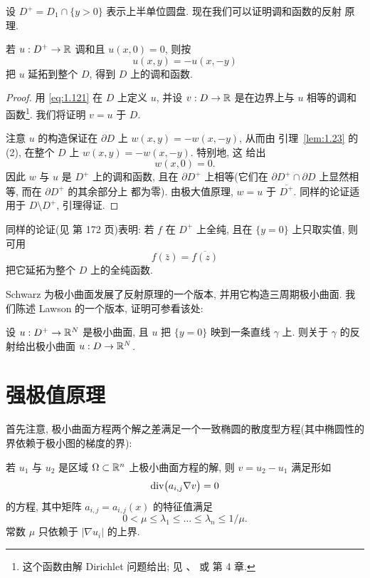 设 $D^+=D_1\cap\{y>0\}$ 表示上半单位圆盘. 现在我们可以证明调和函数的反射
原理.

\begin{lemma}
\label{lem:1.24}
若 $u:D^+\to\mathbb{R}$ 调和且 $u(x,0)=0$, 则按
\begin{equation}
u(x,y)=-u(x,-y)
\label{eq:1.121}
\end{equation}
把 $u$ 延拓到整个 $D$, 得到 $D$ 上的调和函数.
\end{lemma}

\begin{proof}
用 \eqref{eq:1.121} 在 $D$ 上定义 $u$, 并设 $v:D\to\mathbb{R}$ 是在边界上与 $u$ 相等的调和
函数\footnote{这个函数由解 Dirichlet 问题给出; 见 \cite{GiTr}、\cite{A} 或
第 4 章.}. 我们将证明 $v=u$ 于 $D$.

注意 $u$ 的构造保证在 $\partial D$ 上 $w(x,y)=-w(x,-y)$, 从而由
引理~\ref{lem:1.23} 的 (2), 在整个 $D$ 上 $w(x,y)=-w(x,-y)$. 特别地, 这
给出
\[
w(x,0)=0.
\]
因此 $w$ 与 $u$ 是 $D^+$ 上的调和函数, 且在 $\partial D^+$ 上相等(它们在
$\partial D^+\cap\partial D$ 上显然相等, 而在 $\partial D^+$ 的其余部分上
都为零). 由极大值原理, $w=u$ 于 $\overline{D^+}$. 同样的论证适用于
$D\setminus D^+$, 引理得证.
\end{proof}

同样的论证(见 \cite{A} 第 172 页)表明: 若 $f$ 在 $D^+$ 上全纯, 且在
$\{y=0\}$ 上只取实值, 则可用
\[
f(\bar z)=\overline{f(z)}
\]
把它延拓为整个 $D$ 上的全纯函数.

Schwarz 为极小曲面发展了反射原理的一个版本, 并用它构造三周期极小曲面.
我们陈述 Lawson \cite{La2} 的一个版本, 证明可参看该处:

\begin{proposition}[Schwarz 反射]
\label{prop:1.25}
设 $u:D^+\to\mathbb{R}^N$ 是极小曲面, 且 $u$ 把 $\{y=0\}$ 映到一条直线 $\gamma$
上. 则关于 $\gamma$ 的反射给出极小曲面 $u:D\to\mathbb{R}^N$.
\end{proposition}

\section{强极值原理}
\label{sec:1.7}

首先注意, 极小曲面方程两个解之差满足一个一致椭圆的散度型方程(其中椭圆性的
界依赖于极小图的梯度的界):

\begin{lemma}
\label{lem:1.26}
若 $u_1$ 与 $u_2$ 是区域 $\Omega\subset\mathbb{R}^n$ 上极小曲面方程的解, 则
$v=u_2-u_1$ 满足形如
\begin{equation}
\operatorname{div}\bigl(a_{i,j}\nabla v\bigr)=0
\label{eq:1.122}
\end{equation}
的方程, 其中矩阵 $a_{i,j}=a_{i,j}(x)$ 的特征值满足
\begin{equation}
0<\mu\leq\lambda_1\leq\dots\leq\lambda_n\leq1/\mu.
\label{eq:1.123}
\end{equation}
常数 $\mu$ 只依赖于 $|\nabla u_i|$ 的上界.
\end{lemma}

